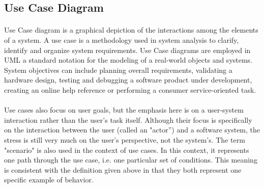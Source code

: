 \documentclass[12pt]{article}
\begin{document}
\subsection*{Use Case Diagram}
\paragraph*{}
Use Case diagram is a graphical depiction of the interactions among the elements of a system. A use case is a methodology used in system analysis to clarify, identify and organize system requirements. Use Case diagrams are employed in UML a standard notation for the modeling of a real-world objects and systems. System objectives can include planning overall requirements, validating a hardware design, testing and debugging a software product under development, creating an online help reference or performing a consumer service-oriented task.
\paragraph*{}
Use cases also focus on user goals, but the emphasis here is on a user-system interaction rather than the user's task itself. Although their focus is specifically on the interaction between the user (called an "actor'') and a software system, the stress is still very much on the user's perspective, not the system's. The term "scenario" is also used in the context of use cases. In this context, it represents one path through the use case, i.e. one particular set of conditions. This meaning is consistent with the definition given above in that they both represent one specific example of behavior.
\end{document}
